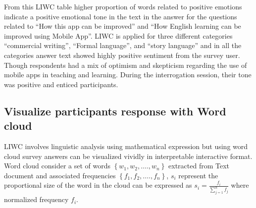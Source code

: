 \documentclass[sn-mathphys,Numbered]{sn-jnl}%
\theoremstyle{thmstyleone}%
\theoremstyle{thmstyletwo}%
\theoremstyle{thmstylethree}%
\begin{document}
From this LIWC table higher proportion of words related to positive
emotions indicate a positive emotional tone in the text in the answer
for the questions related to ``How this app can be improved'' and ``How
English learning can be improved using Mobile App''. LIWC is applied for
three different categories ``commercial writing'', ``Formal language'',
and ``story language'' and in all the categories answer text showed
highly positive sentiment from the survey user. Though respondents had a
mix of optimism and skepticism regarding the use of mobile apps in
teaching and learning. During the interrogation session, their tone was
positive and enticed participants.

\subsection{Visualize participants response with Word cloud}

LIWC involves linguistic analysis using mathematical expression but
using word cloud survey answers can be visualized vividly in
interpretable interactive format. Word cloud consider a set of words
\(\left\{ w_{1},w_{2},\ldots.,w_{n} \right\}\) extracted from Text
document and associated frequencies
\(\left\{ f_{1},f_{2},\ldots.,f_{n} \right\}\), \(s_{i}\) represent the
proportional size of the word in the cloud can be expressed as
\(s_{i} = \frac{f_{i}}{\sum_{j = 1}^{n}f_{j}}\) where normalized
frequency \(f_{i}\).
\end{document}

